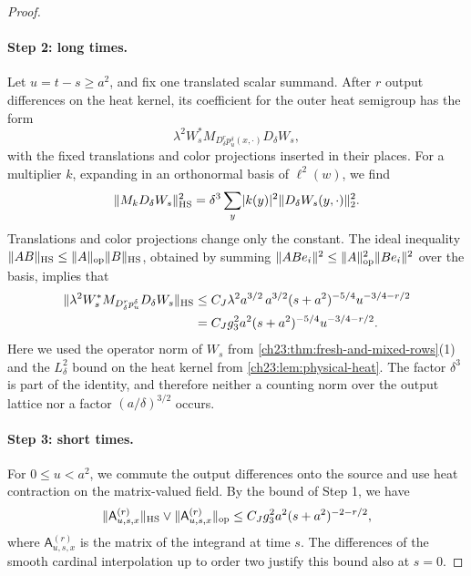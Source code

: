 \begin{proof}
\paragraph{Step 2: long times.}
Let $u=t-s\ge a^2$, and fix one translated scalar summand. After $r$ output differences on the heat kernel, its coefficient for the outer heat semigroup has the form
\[
 \lambda^2W_s^*M_{D_\delta^rp_u^\delta(x,\cdot)}D_\delta W_s,
\]
with the fixed translations and color projections inserted in their places. For a multiplier $k$, expanding in an orthonormal basis of $\ell^2(w)$, we find
\[
 \lVert M_kD_\delta W_s\rVert_{\mathrm{HS}}^2=\delta^3\sum_y\lvert k(y)\rvert^2\lVert D_\delta W_s(y,\cdot)\rVert_2^2.
\]
Translations and color projections change only the constant. The ideal inequality $\lVert AB\rVert_{\mathrm{HS}}\le\lVert A\rVert_{\mathrm{op}}\lVert B\rVert_{\mathrm{HS}}$, obtained by summing $\lVert ABe_i\rVert^2\le\lVert A\rVert_{\mathrm{op}}^2\lVert Be_i\rVert^2$ over the basis, implies that
\begin{align*}
 \lVert \lambda^2W_s^*M_{D_\delta^rp_u^\delta}D_\delta W_s\rVert_{\mathrm{HS}}
 &\le C_J\lambda^2a^{3/2}\,a^{3/2}(s+a^2)^{-5/4}u^{-3/4-r/2}\\
 &=C_Jg_3^2a^2(s+a^2)^{-5/4}u^{-3/4-r/2}.
\end{align*}
Here we used the operator norm of $W_s$ from \cref{ch23:thm:fresh-and-mixed-rows}(1) and the $L^2_\delta$ bound on the heat kernel from \cref{ch23:lem:physical-heat}. The factor $\delta^3$ is part of the identity, and therefore neither a counting norm over the output lattice nor a factor $(a/\delta)^{3/2}$ occurs.

\paragraph{Step 3: short times.}
For $0\le u<a^2$, we commute the output differences onto the source and use heat contraction on the matrix-valued field. By the bound of Step 1, we have
\[
 \lVert \mathsf A_{u,s,x}^{(r)}\rVert_{\mathrm{HS}}\vee\lVert \mathsf A_{u,s,x}^{(r)}\rVert_{\mathrm{op}}\le C_Jg_3^2a^2(s+a^2)^{-2-r/2},
\]
where $\mathsf A_{u,s,x}^{(r)}$ is the matrix of the integrand at time $s$. The differences of the smooth cardinal interpolation up to order two justify this bound also at $s=0$.


\end{proof}
